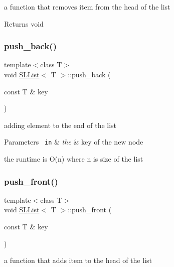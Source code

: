 a function that removes item from the head of the list 

\begin{DoxyReturn}{Returns}
void 
\end{DoxyReturn}
\mbox{\label{classSLList_a4e92731d47c5b3a393ecd2e44de14456}} 
\subsubsection{\texorpdfstring{push\_back()}{push\_back()}}
{\footnotesize\ttfamily template$<$class T$>$ \\
void \mbox{\hyperlink{classSLList}{S\+L\+List}}$<$ T $>$\+::push\+\_\+back (\begin{DoxyParamCaption}\item[{const T \&}]{key }\end{DoxyParamCaption})\hspace{0.3cm}{\ttfamily [inline]}}



adding element to the end of the list 


\begin{DoxyParams}[1]{Parameters}
\mbox{\texttt{ in}}  & {\em the} & key of the new node\\
\hline
\end{DoxyParams}
the runtime is O(n) where n is size of the list \mbox{\label{classSLList_afb451968c186c87b26a00caf30de856c}} 
\subsubsection{\texorpdfstring{push\_front()}{push\_front()}}
{\footnotesize\ttfamily template$<$class T$>$ \\
void \mbox{\hyperlink{classSLList}{S\+L\+List}}$<$ T $>$\+::push\+\_\+front (\begin{DoxyParamCaption}\item[{const T \&}]{key }\end{DoxyParamCaption})\hspace{0.3cm}{\ttfamily [inline]}}



a function that adds item to the head of the list 


